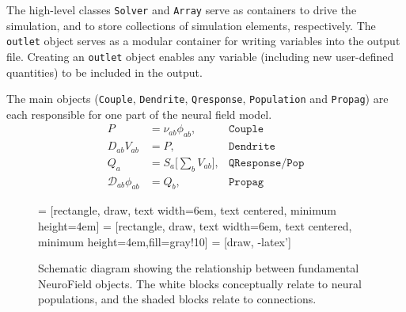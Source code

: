 \documentclass[preprint,review,10pt,authoryear,letterpaper]{elsarticle}
\begin{document}
The high-level classes \texttt{Solver} and \texttt{Array} serve as containers to drive the simulation, and to store collections of simulation elements, respectively. The \texttt{outlet} object serves as a modular container for writing variables into the output file. Creating an \texttt{outlet} object enables any variable (including new user-defined quantities) to be included in the output. 

The main objects (\texttt{Couple}, \texttt{Dendrite}, \texttt{Qresponse}, \texttt{Population} and \texttt{Propag}) are each responsible for one part of the neural field model. 
\begin{align}
	P &= \nu_{ab}\phi_{ab}, & \mathtt{Couple}\\
	D_{ab}V_{ab} &= P, & \mathtt{Dendrite}\\
	Q_a &= S_a \big[\sum_b V_{ab} \big], & \mathtt{QResponse/Pop}\\
	\mathcal{D}_{ab}\phi_{ab} &= Q_b,&  \mathtt{Propag}
\end{align}

\begin{figure}
 = [rectangle, draw, text width=6em, text centered, minimum height=4em]
 = [rectangle, draw, text width=6em, text centered, minimum height=4em,fill=gray!10]
 = [draw, -latex']    
\caption{Schematic diagram showing the relationship between fundamental NeuroField objects. The white blocks conceptually relate to neural populations, and the shaded blocks relate to connections.}
\label{fig:components}
\end{figure}
\end{document}
